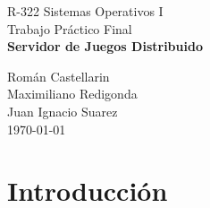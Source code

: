 \documentclass[12pt]{article}
\begin{document}
\begin{titlepage}
\vspace{0.5cm}

\begin{center}
\normalsize{\sc R-322 Sistemas Operativos I}\\
\vspace{0.5cm}
\large{Trabajo Práctico Final}\\

\Large{\bf Servidor de Juegos Distribuido}\\
\vspace{5cm}

\normalsize
Román Castellarin\\
Maximiliano Redigonda\\
Juan Ignacio Suarez\\

\vspace*{0.5cm}
\small{ \today }


\end{center}
\end{titlepage}
\newpage
\section{Introducción}
\end{document}
